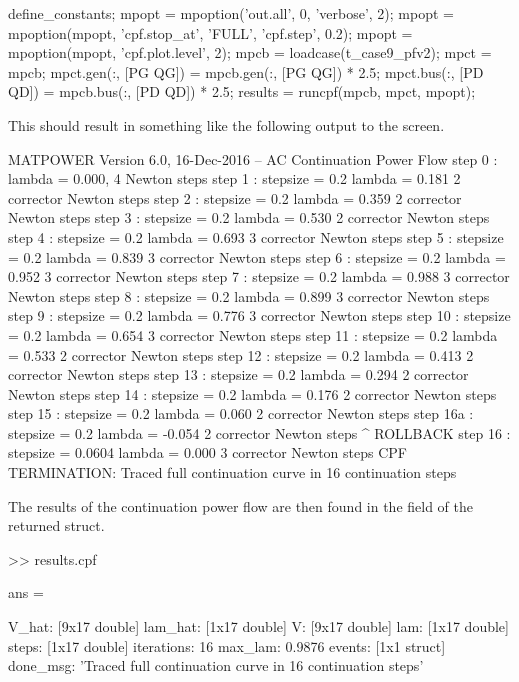 \documentclass[12pt]{article}
\newcommand{\code}[1]{{\relsize{-0.5}{\tt{{#1}}}}}  %
\newcommand{\results}[0]{\code{results}}
\numberwithin{equation}{section}
\numberwithin{table}{section}
\numberwithin{figure}{section}
\begin{document}
\begin{Code}
define_constants;
mpopt = mpoption('out.all', 0, 'verbose', 2);
mpopt = mpoption(mpopt, 'cpf.stop_at', 'FULL', 'cpf.step', 0.2);
mpopt = mpoption(mpopt, 'cpf.plot.level', 2);
mpcb = loadcase(t_case9_pfv2);                      %
mpct = mpcb;                                        %
mpct.gen(:, [PG QG]) = mpcb.gen(:, [PG QG]) * 2.5;  %
mpct.bus(:, [PD QD]) = mpcb.bus(:, [PD QD]) * 2.5;  %
results = runcpf(mpcb, mpct, mpopt);
\end{Code}
This should result in something like the following output to the screen.
\begin{Code}
MATPOWER Version 6.0, 16-Dec-2016 -- AC Continuation Power Flow
step   0  :                      lambda =  0.000,  4 Newton steps
step   1  : stepsize = 0.2       lambda =  0.181   2 corrector Newton steps
step   2  : stepsize = 0.2       lambda =  0.359   2 corrector Newton steps
step   3  : stepsize = 0.2       lambda =  0.530   2 corrector Newton steps
step   4  : stepsize = 0.2       lambda =  0.693   3 corrector Newton steps
step   5  : stepsize = 0.2       lambda =  0.839   3 corrector Newton steps
step   6  : stepsize = 0.2       lambda =  0.952   3 corrector Newton steps
step   7  : stepsize = 0.2       lambda =  0.988   3 corrector Newton steps
step   8  : stepsize = 0.2       lambda =  0.899   3 corrector Newton steps
step   9  : stepsize = 0.2       lambda =  0.776   3 corrector Newton steps
step  10  : stepsize = 0.2       lambda =  0.654   3 corrector Newton steps
step  11  : stepsize = 0.2       lambda =  0.533   2 corrector Newton steps
step  12  : stepsize = 0.2       lambda =  0.413   2 corrector Newton steps
step  13  : stepsize = 0.2       lambda =  0.294   2 corrector Newton steps
step  14  : stepsize = 0.2       lambda =  0.176   2 corrector Newton steps
step  15  : stepsize = 0.2       lambda =  0.060   2 corrector Newton steps
step  16a : stepsize = 0.2       lambda = -0.054   2 corrector Newton steps ^ ROLLBACK
step  16  : stepsize = 0.0604    lambda =  0.000   3 corrector Newton steps
CPF TERMINATION: Traced full continuation curve in 16 continuation steps
\end{Code}
The results of the continuation power flow are then found in the \code{cpf} field of the returned \results{} struct.
\begin{Code}
>> results.cpf

ans = 

         V_hat: [9x17 double]
       lam_hat: [1x17 double]
             V: [9x17 double]
           lam: [1x17 double]
         steps: [1x17 double]
    iterations: 16
       max_lam: 0.9876
        events: [1x1 struct]
      done_msg: 'Traced full continuation curve in 16 continuation steps'
\end{Code}
\end{document}
